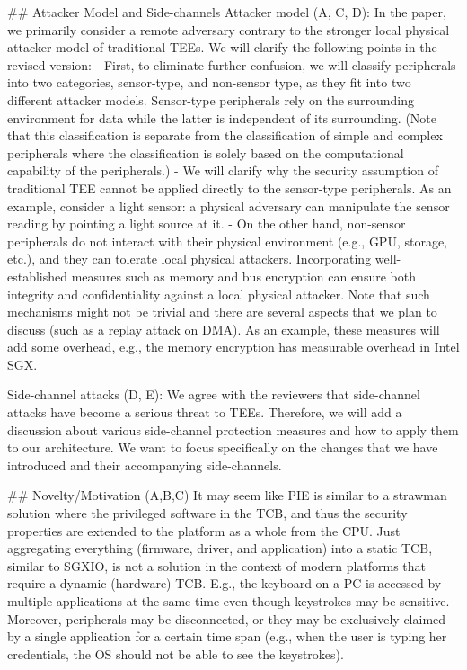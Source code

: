 ## Attacker Model and Side-channels
Attacker model (A, C, D): In the paper, we primarily consider a remote adversary contrary to the stronger local physical attacker model of traditional TEEs. We will clarify the following points in the revised version:
- First, to eliminate further confusion, we will classify peripherals into two categories, sensor-type, and non-sensor type, as they fit into two different attacker models. Sensor-type peripherals rely on the surrounding environment for data while the latter is independent of its surrounding. (Note that this classification is separate from the classification of simple and complex peripherals where the classification is solely based on the computational capability of the peripherals.)
- We will clarify why the security assumption of traditional TEE cannot be applied directly to the sensor-type peripherals. As an example, consider a light sensor: a physical adversary can manipulate the sensor reading by pointing a light source at it.
- On the other hand, non-sensor peripherals do not interact with their physical environment (e.g., GPU, storage, etc.), and they can tolerate local physical attackers. Incorporating well-established measures such as memory and bus encryption can ensure both integrity and confidentiality against a local physical attacker. Note that such mechanisms might not be trivial and there are several aspects that we plan to discuss (such as a replay attack on DMA). As an example, these measures will add some overhead, e.g., the memory encryption has measurable overhead in Intel SGX. 


Side-channel attacks (D, E): We agree with the reviewers that side-channel attacks have become a serious threat to TEEs. Therefore, we will add a discussion about various side-channel protection measures and how to apply them to our architecture. We want to focus specifically on the changes that we have introduced and their accompanying side-channels. 

## Novelty/Motivation (A,B,C)
It may seem like PIE is similar to a strawman solution where the privileged software in the TCB, and thus the security properties are extended to the platform as a whole from the CPU. Just aggregating everything (firmware, driver, and application) into a static TCB, similar to SGXIO, is not a solution in the context of modern platforms that require a dynamic (hardware) TCB. E.g., the keyboard on a PC is accessed by multiple applications at the same time even though keystrokes may be sensitive. Moreover, peripherals may be disconnected, or they may be exclusively claimed by a single application for a certain time span (e.g., when the user is typing her credentials, the OS should not be able to see the keystrokes).


